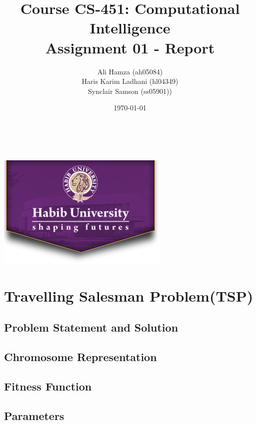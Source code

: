 \documentclass[12pt, letterpaper]{article}
\begin{document}
\title{\large Course CS-451: Computational Intelligence\\[0.5cm]
        \bf\Large Assignment 01 - Report}
\author{\large Ali Hamza (ah05084) \\ Haris Karim Ladhani (hl04349) \\ Synclair Samson (ss05901))}
\date{\today}
\makeatletter
    \begin{titlepage}
        \begin{center}
        \vbox{}\vspace{5cm}
            {\@title }\\[3cm] 
            {\@author}\\
            \vfill \includegraphics[scale=0.5]{images/logo.png}\\[1cm]
            {\@date}
        \end{center}
    \end{titlepage}
\makeatother

\newpage
\tableofcontents

\section{Travelling Salesman Problem(TSP)}
\subsection{Problem Statement and Solution}
\subsection{Chromosome Representation}

\subsection{Fitness Function}
\subsection{Parameters}
\end{document}
